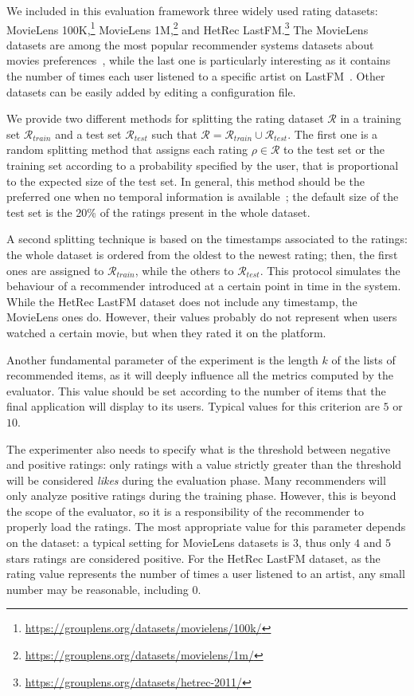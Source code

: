 We included in this evaluation framework three widely used rating datasets: MovieLens 100K,\footnote{\url{https://grouplens.org/datasets/movielens/100k/}} MovieLens 1M,\footnote{\url{https://grouplens.org/datasets/movielens/1m/}} and HetRec LastFM.\footnote{\url{https://grouplens.org/datasets/hetrec-2011/}} The MovieLens datasets are among the most popular recommender systems datasets about movies preferences~\cite{Harper2015}, while the last one is particularly interesting as it contains the number of times each user listened to a specific artist on LastFM~\cite{Cantador2011}. Other datasets can be easily added by editing a configuration file.

We provide two different methods for splitting the rating dataset $\mathcal{R}$ in a training set $\mathcal{R}_{train}$ and a test set $\mathcal{R}_{test}$ such that $\mathcal{R} = \mathcal{R}_{train} \cup \mathcal{R}_{test}$. The first one is a random splitting method that assigns each rating $\rho \in \mathcal{R}$ to the test set or the training set according to a probability specified by the user, that is proportional to the expected size of the test set. In general, this method should be the preferred one when no temporal information is available~\cite{Gunawardana2015}; the default size of the test set is the 20\% of the ratings present in the whole dataset.

A second splitting technique is based on the timestamps associated to the ratings: the whole dataset is ordered from the oldest to the newest rating; then, the first ones are assigned to $\mathcal{R}_{train}$, while the others to $\mathcal{R}_{test}$. This protocol simulates the behaviour of a recommender introduced at a certain point in time in the system. While the HetRec LastFM dataset does not include any timestamp, the MovieLens ones do. However, their values probably do not represent when users watched a certain movie, but when they rated it on the platform.

Another fundamental parameter of the experiment is the length $k$ of the lists of recommended items, as it will deeply influence all the metrics computed by the evaluator. This value should be set according to the number of items that the final application will display to its users. Typical values for this criterion are $5$ or $10$.

The experimenter also needs to specify what is the threshold between negative and positive ratings: only ratings with a value strictly greater than the threshold will be considered \emph{likes} during the evaluation phase. Many recommenders will only analyze positive ratings during the training phase. However, this is beyond the scope of the evaluator, so it is a responsibility of the recommender to properly load the ratings. The most appropriate value for this parameter depends on the dataset: a typical setting for MovieLens datasets is $3$, thus only $4$ and $5$ stars ratings are considered positive. For the HetRec LastFM dataset, as the rating value represents the number of times a user listened to an artist, any small number may be reasonable, including $0$.

